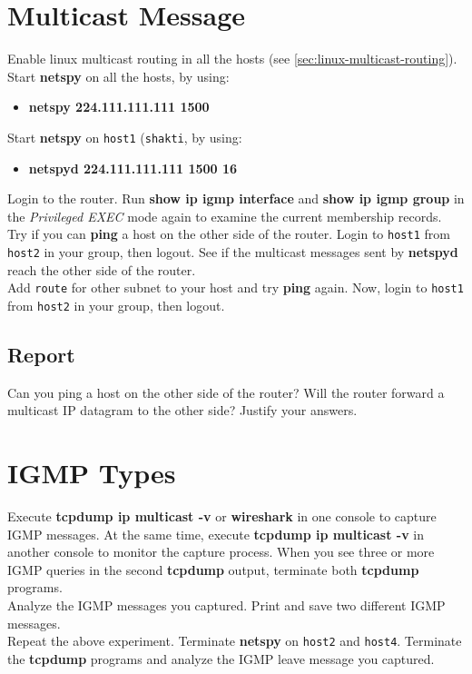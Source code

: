 \documentclass{../UTNetLab}
\begin{document}
\section{Multicast Message}
    Enable linux multicast routing in all the hosts (see \autoref{sec:linux-multicast-routing}).\\
    Start \textbf{netspy} on all the hosts, by using:
    \begin{itemize}
        \item [] \textbf{netspy 224.111.111.111 1500}
    \end{itemize}
    Start \textbf{netspy} on \texttt{host1} (\texttt{shakti}, by using:
    \begin{itemize}
        \item [] \textbf{netspyd 224.111.111.111 1500 16}
    \end{itemize}
    Login to the router.
    Run \textbf{show ip igmp interface} and \textbf{show ip igmp group} in the \textit{Privileged EXEC} mode again to examine the current membership records. \\
    Try if you can \textbf{ping} a host on the other side of the router.
    Login to \texttt{host1} from \texttt{host2} in your group, then logout.
    See if the multicast messages sent by \textbf{netspyd} reach the other side of the router.\\
    Add \texttt{route} for other subnet to your host and try \textbf{ping} again. Now, login to \texttt{host1} from \texttt{host2} in your group, then logout.
    \subsection*{Report}
    Can you ping a host on the other side of the router?
    Will the router forward a multicast IP datagram to the other side?
    Justify your answers.

\section{IGMP Types}
    Execute \textbf{tcpdump ip multicast -v} or \textbf{wireshark} in one console to capture IGMP messages.
    At the same time, execute \textbf{tcpdump ip multicast -v} in another console to monitor the capture process.
    When you see three or more IGMP queries in the second \textbf{tcpdump} output, terminate both \textbf{tcpdump} programs. \\
    Analyze the IGMP messages you captured.
    Print and save two different IGMP messages. \\
    Repeat the above experiment.
    Terminate \textbf{netspy} on \texttt{host2} and \texttt{host4}.
    Terminate the \textbf{tcpdump} programs and analyze the IGMP leave message you captured.
\end{document}
